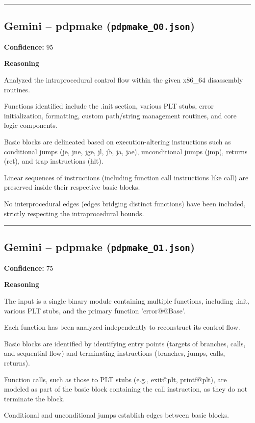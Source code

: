\bigskip
\hrule
\bigskip

\subsection{Gemini -- pdpmake (\texttt{pdpmake\_O0.json})}

\textbf{Confidence:} 95

\textbf{Reasoning}

Analyzed the intraprocedural control flow within the given x86\_64 disassembly routines.

Functions identified include the .init section, various PLT stubs, error initialization, formatting, custom path/string management routines, and core logic components.

Basic blocks are delineated based on execution-altering instructions such as conditional jumps (je, jne, jge, jl, jb, ja, jae), unconditional jumps (jmp), returns (ret), and trap instructions (hlt).

Linear sequences of instructions (including function call instructions like call) are preserved inside their respective basic blocks.

No interprocedural edges (edges bridging distinct functions) have been included, strictly respecting the intraprocedural bounds.

\bigskip
\hrule
\bigskip

\subsection{Gemini -- pdpmake (\texttt{pdpmake\_O1.json})}

\textbf{Confidence:} 75

\textbf{Reasoning}

The input is a single binary module containing multiple functions, including .init, various PLT stubs, and the primary function 'error@@Base'.

Each function has been analyzed independently to reconstruct its control flow.

Basic blocks are identified by identifying entry points (targets of branches, calls, and sequential flow) and terminating instructions (branches, jumps, calls, returns).

Function calls, such as those to PLT stubs (e.g., exit@plt, printf@plt), are modeled as part of the basic block containing the call instruction, as they do not terminate the block.

Conditional and unconditional jumps establish edges between basic blocks.

